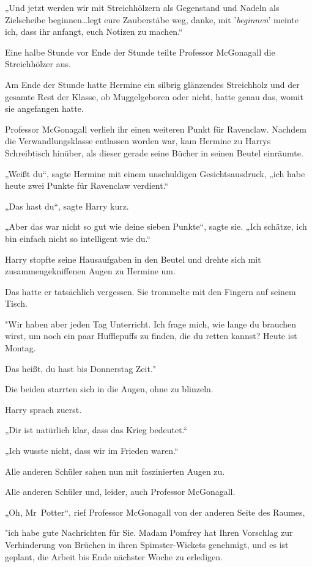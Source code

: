 {„Und jetzt werden wir mit Streichhölzern als Gegenstand und Nadeln als Zielscheibe beginnen…legt eure Zauberstäbe weg, danke, mit '\emph{beginnen}' meinte ich, dass ihr anfangt, euch Notizen zu machen.“

Eine halbe Stunde vor Ende der Stunde teilte Professor McGonagall die Streichhölzer aus.

Am Ende der Stunde hatte Hermine ein silbrig glänzendes Streichholz und der gesamte Rest der Klasse, ob Muggelgeboren oder nicht, hatte genau das, womit sie angefangen hatte.

Professor McGonagall verlieh ihr einen weiteren Punkt für Ravenclaw. Nachdem die Verwandlungsklasse entlassen worden war, kam Hermine zu Harrys Schreibtisch hinüber, als dieser gerade seine Bücher in seinen Beutel einräumte.

„Weißt du“, sagte Hermine mit einem unschuldigen Gesichtsausdruck, „ich habe heute zwei Punkte für Ravenclaw verdient.“

„Das hast du“, sagte Harry kurz.

„Aber das war nicht so gut wie deine sieben Punkte“, sagte sie. „Ich schätze, ich bin einfach nicht so intelligent wie du.“

Harry stopfte seine Hausaufgaben in den Beutel und drehte sich mit zusammengekniffenen Augen zu Hermine um.

Das hatte er tatsächlich vergessen. Sie trommelte mit den Fingern auf seinem Tisch.

"Wir haben aber jeden Tag Unterricht. Ich frage mich, wie lange du brauchen wirst, um noch ein paar Hufflepuffs zu finden, die du retten kannst? Heute ist Montag.

Das heißt, du hast bis Donnerstag Zeit."

Die beiden starrten sich in die Augen, ohne zu blinzeln.

Harry sprach zuerst.

„Dir ist natürlich klar, dass das Krieg bedeutet.“

„Ich wusste nicht, dass wir im Frieden waren.“

Alle anderen Schüler sahen nun mit faszinierten Augen zu.

Alle anderen Schüler und, leider, auch Professor McGonagall.

„Oh, Mr~Potter“, rief Professor McGonagall von der anderen Seite des Raumes,

"ich habe gute Nachrichten für Sie. Madam Pomfrey hat Ihren Vorschlag zur Verhinderung von Brüchen in ihren Spimster-Wickets genehmigt, und es ist geplant, die Arbeit bis Ende nächster Woche zu erledigen.

}

